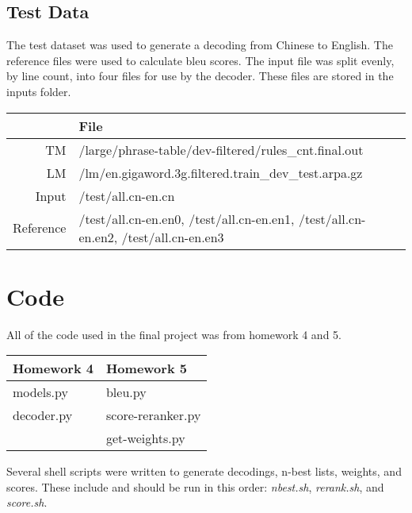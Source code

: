 \documentclass[letterpaper]{article}
\begin{document}
\subsection{Test Data}

\indent \indent The test dataset was used to generate a decoding from Chinese to English. The reference files were used to calculate bleu scores. The input file was split evenly, by line count, into four files for use by the decoder. These files are stored in the inputs folder.

\begin{center}
    \begin{tabular}{|r|l|}
        \hline
         & File\\
        \hline
        TM & /large/phrase-table/dev-filtered/rules\_cnt.final.out\\
        \hline
        LM & /lm/en.gigaword.3g.filtered.train\_dev\_test.arpa.gz\\
        \hline
        Input & /test/all.cn-en.cn\\
        \hline
        Reference & /test/all.cn-en.en0, /test/all.cn-en.en1, /test/all.cn-en.en2, /test/all.cn-en.en3\\
        \hline
    \end{tabular}
\end{center}

\section{Code}

\indent \indent All of the code used in the final project was from homework 4 and 5.

\begin{center}
    \begin{tabular}{|l|l|}
        \hline
        Homework 4 & Homework 5\\
        \hline
        models.py & bleu.py\\
        \hline
        decoder.py & score-reranker.py\\
        \hline
         & get-weights.py\\
        \hline
    \end{tabular}
\end{center}

Several shell scripts were written to generate decodings, n-best lists, weights, and scores. These include and should be run in this order: \textit{nbest.sh}, \textit{rerank.sh}, and \textit{score.sh}.
\end{document}
